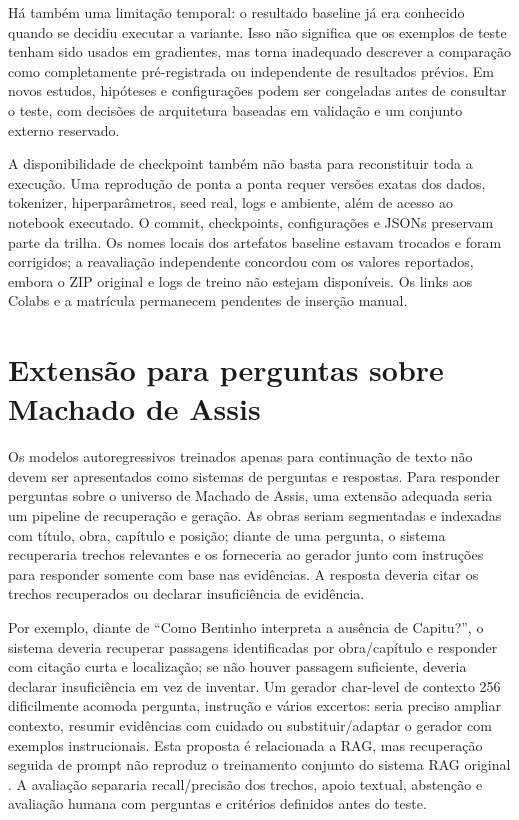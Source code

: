 \documentclass[conference]{IEEEtran}
\begin{document}
Há também uma limitação temporal: o resultado baseline já era conhecido quando se decidiu executar a variante. Isso não significa que os exemplos de teste tenham sido usados em gradientes, mas torna inadequado descrever a comparação como completamente pré-registrada ou independente de resultados prévios. Em novos estudos, hipóteses e configurações podem ser congeladas antes de consultar o teste, com decisões de arquitetura baseadas em validação e um conjunto externo reservado.

A disponibilidade de checkpoint também não basta para reconstituir toda a execução. Uma reprodução de ponta a ponta requer versões exatas dos dados, tokenizer, hiperparâmetros, seed real, logs e ambiente, além de acesso ao notebook executado. O commit, checkpoints, configurações e JSONs preservam parte da trilha. Os nomes locais dos artefatos baseline estavam trocados e foram corrigidos; a reavaliação independente concordou com os valores reportados, embora o ZIP original e logs de treino não estejam disponíveis. Os links aos Colabs e a matrícula permanecem pendentes de inserção manual.

\section{Extensão para perguntas sobre Machado de Assis}

Os modelos autoregressivos treinados apenas para continuação de texto não devem ser apresentados como sistemas de perguntas e respostas. Para responder perguntas sobre o universo de Machado de Assis, uma extensão adequada seria um pipeline de recuperação e geração. As obras seriam segmentadas e indexadas com título, obra, capítulo e posição; diante de uma pergunta, o sistema recuperaria trechos relevantes e os forneceria ao gerador junto com instruções para responder somente com base nas evidências. A resposta deveria citar os trechos recuperados ou declarar insuficiência de evidência.

Por exemplo, diante de “Como Bentinho interpreta a ausência de Capitu?”, o sistema deveria recuperar passagens identificadas por obra/capítulo e responder com citação curta e localização; se não houver passagem suficiente, deveria declarar insuficiência em vez de inventar. Um gerador char-level de contexto 256 dificilmente acomoda pergunta, instrução e vários excertos: seria preciso ampliar contexto, resumir evidências com cuidado ou substituir/adaptar o gerador com exemplos instrucionais. Esta proposta é relacionada a RAG, mas recuperação seguida de prompt não reproduz o treinamento conjunto do sistema RAG original \cite{lewis2020rag}. A avaliação separaria recall/precisão dos trechos, apoio textual, abstenção e avaliação humana com perguntas e critérios definidos antes do teste.
\end{document}
